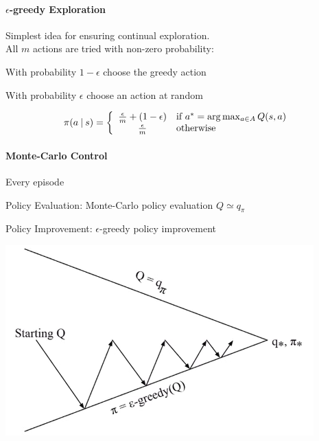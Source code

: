 \documentclass[10pt]{report}
\begin{document}
\paragraph{$\epsilon$-greedy Exploration} Simplest idea for ensuring continual exploration.\\
All $m$ actions are tried with non-zero probability:\begin{list}{}{}
	\item With probability $1-\epsilon$ choose the greedy action
	\item With probability $\epsilon$ choose an action at random
\end{list}
$$\pi(a\:|\:s)= \left\{\begin{array}{c l}
\frac{\epsilon}{m}+(1-\epsilon)&\text{if }a^*=\arg\max_{a\in A}Q(s,a)\\
\frac{\epsilon}{m}&\text{otherwise}
\end{array}\right.$$
\paragraph{Monte-Carlo Control} Every episode
\begin{list}{}{}
	\item Policy Evaluation: Monte-Carlo policy evaluation $Q\simeq q_\pi$
	\item Policy Improvement: $\epsilon$-greedy policy improvement
\end{list}
\begin{center}
	\includegraphics[scale=0.5]{172.png}
\end{center}
\end{document}
